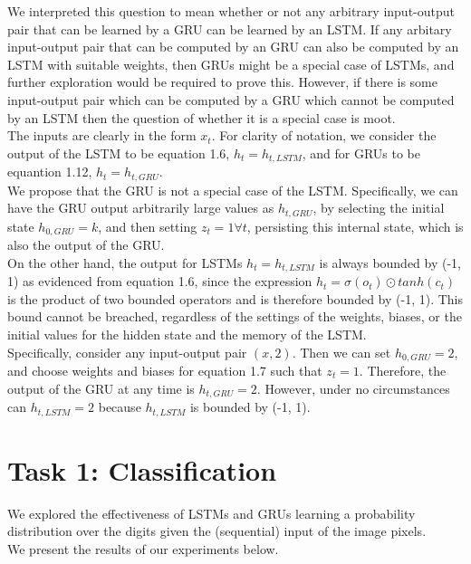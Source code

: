 \documentclass[paper=a4, fontsize=11pt]{scrartcl} %
\numberwithin{equation}{section} %
\numberwithin{figure}{section} %
\numberwithin{table}{section} %
\begin{document}
We interpreted this question to mean whether or not any arbitrary input-output pair that can be learned by a GRU can be learned by an LSTM. If any arbitary input-output pair that can be computed by an GRU can also be computed by an LSTM with suitable weights, then GRUs might be a special case of LSTMs, and further exploration would be required to prove this. However, if there is some input-output pair which can be computed by a GRU which cannot be computed by an LSTM then the question of whether it is a special case is moot.\\

The inputs are clearly in the form $x_t$. For clarity of notation, we consider the output of the LSTM to be equation 1.6, $h_t = h_{t,LSTM}$, and for GRUs to be equantion 1.12, $h_t = h_{t,GRU}$.\\

We propose that the GRU is not a special case of the LSTM. Specifically, we can have the GRU output arbitrarily large values as $h_{t,GRU}$, by selecting the initial state $h_{0,GRU} = k$, and then setting $z_t = 1 \forall t$, persisting this internal state, which is also the output of the GRU.\\

On the other hand, the output for LSTMs $h_t = h_{t,LSTM}$ is always bounded by (-1, 1) as evidenced from equation 1.6, since the expression $h_t = \sigma (o_t) \odot tanh(c_t)$ is the product of two bounded operators and is therefore bounded by (-1, 1). This bound cannot be breached, regardless of the settings of the weights, biases, or the initial values for the hidden state and the memory of the LSTM.\\

Specifically, consider any input-output pair $(x, 2)$. Then we can set $h_{0,GRU} = 2$, and choose weights and biases for equation 1.7 such that $z_t = 1$. Therefore, the output of the GRU at any time is $h_{t,GRU} = 2$. However, under no circumstances can $ h_{t,LSTM} = 2$ because $ h_{t,LSTM}$ is bounded by (-1, 1).

\section{Task 1: Classification}

We explored the effectiveness of LSTMs and GRUs learning a probability distribution over the digits given the (sequential) input of the image pixels. \\

We present the results of our experiments below.
\end{document}
